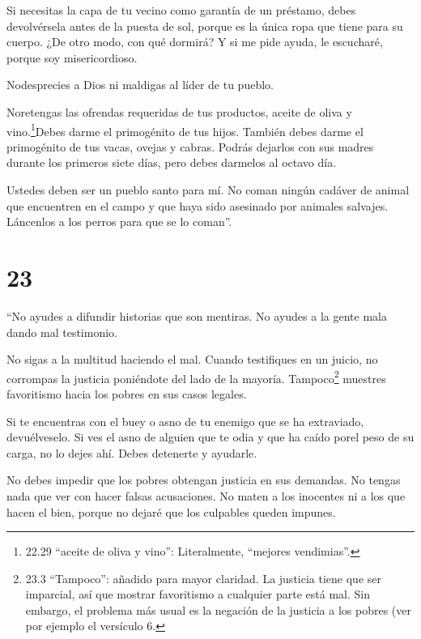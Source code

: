  Si necesitas la capa de tu vecino como garantía de un
préstamo, debes devolvérsela antes de la puesta de sol, 
porque es la única ropa que tiene para su cuerpo. ¿De otro modo, con qué
dormirá? Y si me pide ayuda, le escucharé, porque soy misericordioso.

 Nodesprecies a Dios ni maldigas al líder de tu pueblo.

 Noretengas las ofrendas requeridas de tus productos,
aceite de oliva y vino.\footnote{22.29 ``aceite de oliva y vino'':
  Literalmente, ``mejores vendimias''.}Debes darme el primogénito de tus
hijos.  También debes darme el primogénito de tus vacas,
ovejas y cabras. Podrás dejarlos con sus madres durante los primeros
siete días, pero debes darmelos al octavo día.

 Ustedes deben ser un pueblo santo para mí. No coman ningún
cadáver de animal que encuentren en el campo y que haya sido asesinado
por animales salvajes. Láncenlos a los perros para que se lo coman''.

\hypertarget{section-22}{%
\section{23}\label{section-22}}

 ``No ayudes a difundir historias que son mentiras. No
ayudes a la gente mala dando mal testimonio.

 No sigas a la multitud haciendo el mal. Cuando testifiques
en un juicio, no corrompas la justicia poniéndote del lado de la
mayoría.  Tampoco\footnote{23.3 ``Tampoco'': añadido para
  mayor claridad. La justicia tiene que ser imparcial, así que mostrar
  favoritismo a cualquier parte está mal. Sin embargo, el problema más
  usual es la negación de la justicia a los pobres (ver por ejemplo el
  versículo 6.} muestres favoritismo hacia los pobres en sus casos
legales.

 Si te encuentras con el buey o asno de tu enemigo que se ha
extraviado, devuélveselo.  Si ves el asno de alguien que te
odia y que ha caído porel peso de su carga, no lo dejes ahí. Debes
detenerte y ayudarle.

 No debes impedir que los pobres obtengan justicia en sus
demandas.  No tengas nada que ver con hacer falsas
acusaciones. No maten a los inocentes ni a los que hacen el bien, porque
no dejaré que los culpables queden impunes.

